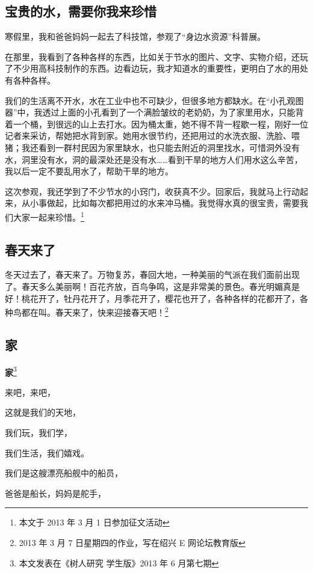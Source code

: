 \documentclass[UTF8,a4paper,titlepage,twoside,10.5pt]{article}
\begin{document}
\subsection{宝贵的水，需要你我来珍惜}
\label{sec:org6cfcfce}

寒假里，我和爸爸妈妈一起去了科技馆，参观了“身边水资源”科普展。

在那里，我看到了各种各样的东西，比如关于节水的图片、文字、实物介绍，还玩了不少用高科技制作的东西。边看边玩，我才知道水的重要性，更明白了水的用处有各种各样。

我们的生活离不开水，水在工业中也不可缺少，但很多地方都缺水。在“小孔观图器”中，我透过上面的小孔看到了一个满脸皱纹的老奶奶，为了家里用水，只能背着一个桶，到很远的山上去打水。因为桶太重，她不得不背一程歇一程，刚好一位记者来采访，帮她把水背到家。她用水很节约，还把用过的水洗衣服、洗脸、喂猪；我还看到一群村民因为家里缺水，也只能去附近的洞里找水，可惜洞外没有水，洞里没有水，洞的最深处还是没有水……看到干旱的地方人们用水这么辛苦，我以后一定不要乱用水了，帮助干旱的地方。

这次参观，我还学到了不少节水的小窍门，收获真不少。回家后，我就马上行动起来，从小事做起，比如每次都把用过的水来冲马桶。我觉得水真的很宝贵，需要我们大家一起来珍惜。\footnote{本文于 2013 年 3 月 1 日参加征文活动}

\subsection{春天来了}
\label{sec:org01c6c58}

冬天过去了，春天来了。万物复苏，春回大地，一种美丽的气派在我们面前出现了。春天多么美丽啊！百花齐放，百鸟争鸣，这是非常美的景色。春光明媚真是好！桃花开了，牡丹花开了，月季花开了，樱花也开了，各种各样的花都开了，各种鸟都在叫。春天来了，快来迎接春天吧！\footnote{2013 年 3 月 7 日星期四的作业，写在绍兴 E 网论坛教育版}

\subsection{家}
\label{sec:org7de8fca}

\textbf{家}\footnote{本文发表在《树人研究 学生版》2013 年 6 月第七期}

来吧，来吧，

这就是我们的天地，

我们玩，我们学，

我们生活，我们嬉戏。

我们是这艘漂亮船舰中的船员，

爸爸是船长，妈妈是舵手，
\end{document}
